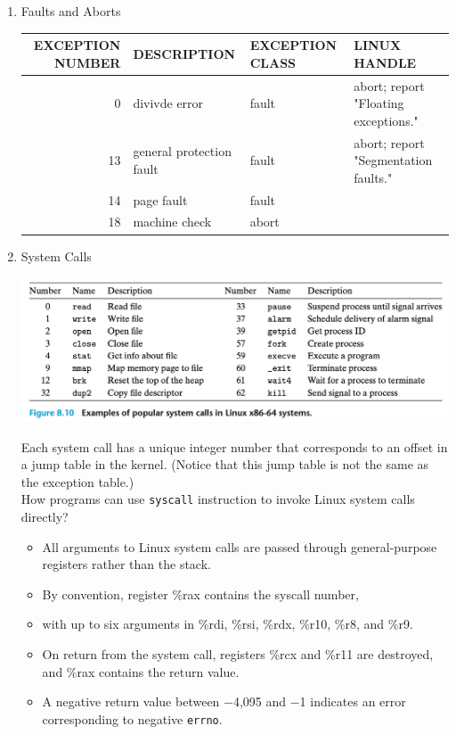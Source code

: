 \documentclass[11pt]{article}
\begin{document}
\begin{enumerate}
\item Faults and Aborts
\label{sec:org212d181}
\begin{center}
\begin{tabular}{rlll}
EXCEPTION NUMBER & DESCRIPTION & EXCEPTION CLASS & LINUX HANDLE\\
\hline
0 & divivde error & fault & abort; report "Floating exceptions."\\
13 & general protection fault & fault & abort; report "Segmentation faults."\\
14 & page fault & fault & \\
18 & machine check & abort & \\
\end{tabular}
\end{center}



\item System Calls
\label{sec:org8f084d9}

\begin{center}
\includegraphics[width=.9\linewidth]{pics/figure8.10-system-calls.png}
\end{center}

Each system call has a unique integer number that corresponds to an offset in a jump table in the kernel. (Notice that this jump table is not the same as the exception table.)\\


How programs can use \texttt{syscall} instruction to invoke Linux system calls directly?\\
\begin{itemize}
\item All arguments to Linux system calls are passed through general-purpose registers rather than the stack.\\
\item By convention, register \%rax contains the syscall number,\\
\item with up to six arguments in \%rdi, \%rsi, \%rdx, \%r10, \%r8, and \%r9.\\
\item On return from the system call, registers \%rcx and \%r11 are destroyed, and \%rax contains the return value.\\
\item A negative return value between −4,095 and −1 indicates an error corresponding to negative \texttt{errno}.\\
\end{itemize}
\end{enumerate}
\end{document}

